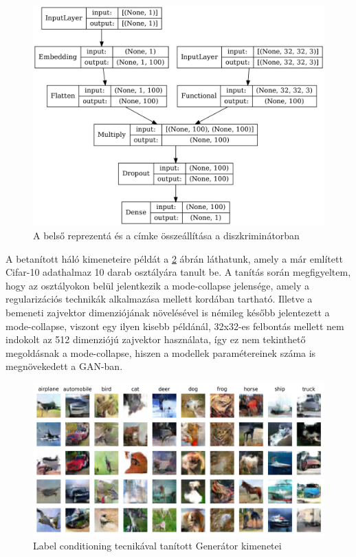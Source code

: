 \begin{figure}[h]
	\centering
	\includegraphics[width=13cm]{images/label_discriminator.png}
	\caption{A belső reprezentá és a címke összeállítása a diszkriminátorban}
	\label{fig:labeldiscriminator}
\end{figure}

A betanított háló kimeneteire példát a \ref{fig:labelconditioning} ábrán láthatunk, amely a már említett Cifar-10 adathalmaz 10 darab osztályára tanult be. A tanítás során megfigyeltem, hogy az osztályokon belül jelentkezik a mode-collapse jelensége, amely a regularizációs technikák alkalmazása mellett kordában tartható. Illetve a bemeneti zajvektor dimenziójának növelésével is némileg később jelentezett a mode-collapse, viszont egy ilyen kisebb példánál, 32x32-es felbontás mellett nem indokolt az 512 dimenziójú zajvektor használata, így ez nem tekinthető megoldásnak a mode-collapse, hiszen a modellek paramétereinek száma is megnövekedett a GAN-ban.

\begin{figure}[h]
	\centering
	\includegraphics[width=13cm]{images/label_conditioning.png}
	\caption{Label conditioning tecnikával tanított Generátor kimenetei}
	\label{fig:labelconditioning}
\end{figure}


